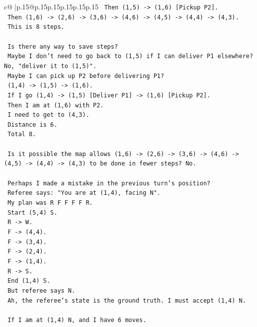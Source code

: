 \documentclass{article}
\begin{document}
{\begin{supertabular}{c@{$\;$}|p{.15\linewidth}@{}p{.15\linewidth}p{.15\linewidth}p{.15\linewidth}p{.15\linewidth}p{.15\linewidth}}
{{{\texttt{   Then (1,5) {-}> (1,6) {[}Pickup P2{]}.} \\
\texttt{   Then (1,6) {-}> (2,6) {-}> (3,6) {-}> (4,6) {-}> (4,5) {-}> (4,4) {-}> (4,3).} \\
\texttt{   This is 8 steps.} \\
\\ 
\texttt{   Is there any way to save steps?} \\
\texttt{   Maybe I don't need to go back to (1,5) if I can deliver P1 elsewhere? No, "deliver it to (1,5)".} \\
\texttt{   Maybe I can pick up P2 before delivering P1?} \\
\texttt{   (1,4) {-}> (1,5) {-}> (1,6).} \\
\texttt{   If I go (1,4) {-}> (1,5) {[}Deliver P1{]} {-}> (1,6) {[}Pickup P2{]}.} \\
\texttt{   Then I am at (1,6) with P2.} \\
\texttt{   I need to get to (4,3).} \\
\texttt{   Distance is 6.} \\
\texttt{   Total 8.} \\
\\ 
\texttt{   Is it possible the map allows (1,6) {-}> (2,6) {-}> (3,6) {-}> (4,6) {-}> (4,5) {-}> (4,4) {-}> (4,3) to be done in fewer steps? No.} \\
\\ 
\texttt{   Perhaps I made a mistake in the previous turn's position?} \\
\texttt{   Referee says: "You are at (1,4), facing N".} \\
\texttt{   My plan was R F F F F R.} \\
\texttt{   Start (5,4) S.} \\
\texttt{   R {-}> W.} \\
\texttt{   F {-}> (4,4).} \\
\texttt{   F {-}> (3,4).} \\
\texttt{   F {-}> (2,4).} \\
\texttt{   F {-}> (1,4).} \\
\texttt{   R {-}> S.} \\
\texttt{   End (1,4) S.} \\
\texttt{   But referee says N.} \\
\texttt{   Ah, the referee's state is the ground truth. I must accept (1,4) N.} \\
\\ 
\texttt{   If I am at (1,4) N, and I have 6 moves.} \\
}}}
\end{supertabular}}
\end{document}
